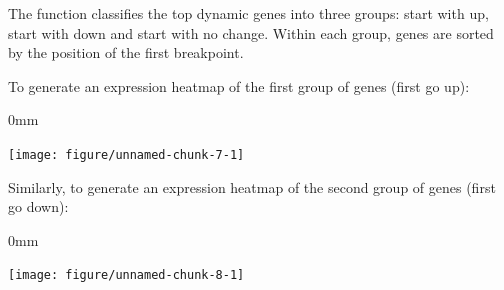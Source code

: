 \documentclass{article}\usepackage[]{graphicx}\usepackage[usenames,dvipsnames]{color}
\newcommand{\hlstr}[1]{\textcolor[rgb]{0.251,0.627,0.251}{#1}}%
\newcommand{\hlopt}[1]{\textcolor[rgb]{0,0,0}{#1}}%
\newcommand{\hlstd}[1]{\textcolor[rgb]{0.251,0.251,0.251}{#1}}%
\newcommand{\hlkwc}[1]{\textcolor[rgb]{0.251,0.251,0.251}{#1}}%
\newcommand{\hlkwd}[1]{\textcolor[rgb]{0.878,0.439,0.125}{#1}}%
\newenvironment{knitrout}{}{} %
\begin{document}
The  function classifies the top dynamic genes into
three groups: start with up, start with down and start with no change.
Within each group, genes are sorted by the position of the first breakpoint.


To generate an expression heatmap of the first group of genes (first go up):

\begin{knitrout}
\color{fgcolor}\begin{adjustwidth}{\fltoffset}{0mm}

{\centering \texttt{[image: figure/unnamed-chunk-7-1]} 

}

\end{adjustwidth}
\end{knitrout}


Similarly, to generate an expression heatmap of the second group of genes (first go down):
\begin{knitrout}
\color{fgcolor}\begin{adjustwidth}{\fltoffset}{0mm}

{\centering \texttt{[image: figure/unnamed-chunk-8-1]} 

}

\end{adjustwidth}
\end{knitrout}
\end{document}

